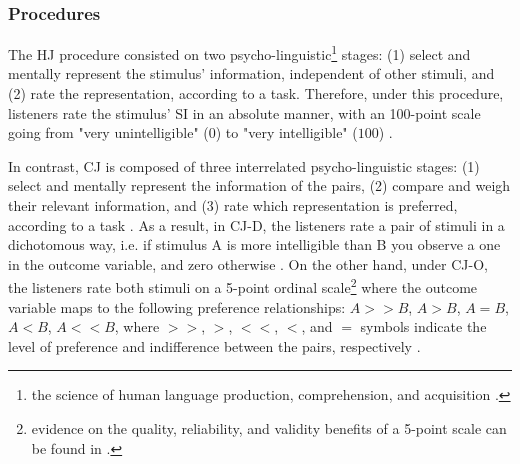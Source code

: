 \subsubsection{Procedures} \label{ss_sect:proc}
%
The HJ procedure consisted on two psycho-linguistic\footnote{the science	of human language production, comprehension, and acquisition \citep{Levelt_1993}.} stages: (1) select and mentally represent the stimulus' information, independent of other stimuli, and (2) rate the representation, according to a task. Therefore, under this procedure, listeners rate the stimulus' SI in an absolute manner, with an 100-point scale going from "very unintelligible" ($0$) to "very intelligible" ($100$) \citep{Boonen_et_al_2021, Faes_et_al_2021}.

In contrast, CJ is composed of three interrelated psycho-linguistic stages: (1) select and mentally represent the information of the pairs, (2) compare and weigh their relevant information, and (3) rate which representation is preferred, according to a task \citep{vanDaal_2020}. As a result, in CJ-D, the listeners rate a pair of stimuli in a dichotomous way, i.e. if stimulus A is more intelligible than B you observe a one in the outcome variable, and zero otherwise \citep{Bradley_et_al_1952}. On the other hand, under CJ-O, the listeners rate both stimuli on a 5-point ordinal scale\footnote{evidence on the quality, reliability, and validity benefits of a 5-point scale can be found in \citet{Revilla_et_al_2014}.} where the outcome variable maps to the following preference relationships: $A>>B$, $A>B$, $A=B$, $A<B$, $A<<B$, where $>>$, $>$, $<<$, $<$, and $=$ symbols indicate the level of preference and indifference between the pairs, respectively \citep{Tutz_1986, Agresti_1992}.
%
%
